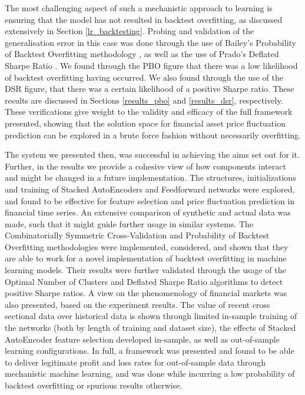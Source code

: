 \documentclass[a4paper,11pt,oneside]{article}
\theoremstyle{plain}
\theoremstyle{definition}
\begin{document}
	The most challenging aspect of such a mechanistic approach to learning is ensuring that the model has not resulted in backtest overfitting, as discussed extensively in Section \ref{lr_backtesting}. Probing and validation of the generalisation error in this case was done through the use of Bailey's Probability of Backtest Overfitting methodology \citep{BailyPBO}, as well as the use of Prado's Deflated Sharpe Ratio \citep{PradoDSR}. We found through the PBO figure that there was a low likelihood of backtest overfitting having occurred. We also found through the use of the DSR figure, that there was a certain likelihood of a positive Sharpe ratio. These results are discussed in Sections \ref{results_pbo} and \ref{results_dsr}, respectively. These verifications give weight to the validity and efficacy of the full framework presented, showing that the solution space for financial asset price fluctuation prediction can be explored in a brute force fashion without necessarily overfitting.\newline

	The system we presented then, was successful in achieving the aims set out for it. Further, in the results we provide a cohesive view of how components interact and might be changed in a future implementation. The structures, initializations and training of Stacked AutoEncoders and Feedforward networks were explored, and found to be effective for feature selection and price fluctuation prediction in financial time series. An extensive comparison of synthetic and actual data was made, such that it might guide further usage in similar systems. The Combinatorially Symmetric Cross-Validation and Probability of Backtest Overfitting methodologies were implemented, considered, and shown that they are able to work for a novel implementation of backtest overfitting in machine learning models. Their results were further validated through the usage of the Optimal Number of Clusters and Deflated Sharpe Ratio algorithms to detect positive Sharpe ratios. A view on the phenomenology of financial markets was also presented, based on the experiment results. The value of recent cross sectional data over historical data is shown through limited in-sample training of the networks (both by length of training and dataset size), the effects of Stacked AutoEncoder feature selection developed in-sample, as well as out-of-sample learning configurations. In full, a framework was presented and found to be able to deliver legitimate profit and loss rates for out-of-sample data through mechanistic machine learning, and was done while incurring a low probability of backtest overfitting or spurious results otherwise.
	
\end{document}
